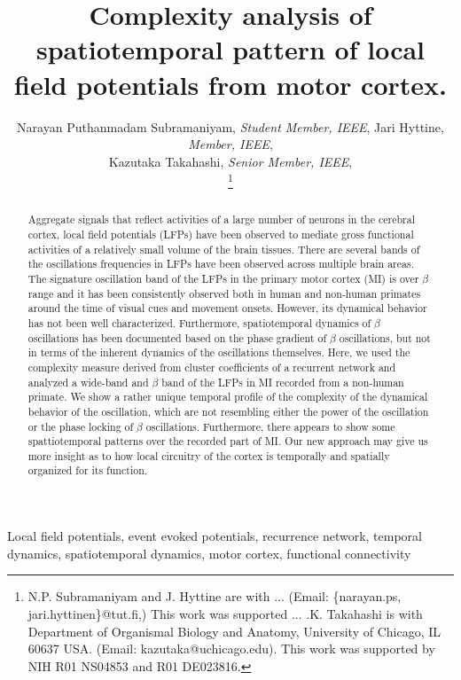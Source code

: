 \documentclass[letterpaper, 9pt, conference]{ieeeconf}
\title{\LARGE \bf
Complexity analysis of spatiotemporal pattern of local field potentials from motor cortex.
}
\author{Narayan Puthanmadam Subramaniyam, {\em Student Member, IEEE}, Jari Hyttine, {\em Member, IEEE}, \\
Kazutaka Takahashi, {\em Senior Member, IEEE}, \\
\thanks{N.P. Subramaniyam and J. Hyttine are with ... 
(Email: \{narayan.ps, jari.hyttinen\}@tut.fi,) This work was supported ... .K. Takahashi is with Department of Organismal Biology and Anatomy, University of Chicago, IL 60637 USA. 
 (Email: kazutaka@uchicago.edu). This work was supported by NIH R01 NS04853 and R01 DE023816.}}
\begin{document}
\maketitle
\thispagestyle{empty}
\pagestyle{empty}



\begin{abstract}
Aggregate signals that reflect activities of a large number of neurons in the cerebral cortex, local field potentials (LFPs) have been observed to mediate gross functional activities of a relatively small volume of the brain tissues. There are several bands of the oscillations frequencies in LFPs have been observed across multiple brain areas. 
The signature oscillation band of the LFPs in the primary motor cortex (MI) is over $\beta$ range and it has been consistently observed both in human and non-human primates around the time of visual cues and movement onsets. 
However, its dynamical behavior has not been well characterized. Furthermore, spatiotemporal dynamics of $\beta$ oscillations has been documented based on the phase gradient of $\beta$ oscillations, but not in terms of the inherent dynamics of the oscillations themselves. Here, we used the complexity measure derived from cluster coefficients of a recurrent network and analyzed a wide-band and $\beta$ band of the LFPs in MI recorded from a non-human primate. We show a rather unique temporal profile of the complexity of the dynamical behavior of the oscillation, which are not resembling either the power of the oscillation or the phase locking of $\beta$ oscillations. Furthermore, there appears to show some spattiotemporal patterns over the recorded part of MI. Our new approach may give us more insight as to how local circuitry of the cortex is temporally and spatially organized for its function. 
\end{abstract}

\begin{keywords}
Local field potentials, event evoked potentials, recurrence network, temporal dynamics, spatiotemporal dynamics,  motor cortex, functional connectivity
\end{keywords}


%
%
%
\end{document}
